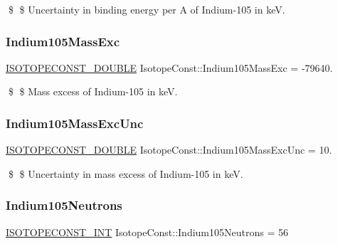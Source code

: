 \$ \$ Uncertainty in binding energy per A of Indium-\/105 in keV. \mbox{\label{group___isotope_const-_indium-_in105_ga42d9afde4d2eefc3d8d59a1fde401a6c}} 
\subsubsection{\texorpdfstring{Indium105\+Mass\+Exc}{Indium105MassExc}}
{\footnotesize\ttfamily \mbox{\hyperlink{group___isotope_const-_macros_ga8f45a7272ce02c0b4c65c44636ed719a}{I\+S\+O\+T\+O\+P\+E\+C\+O\+N\+S\+T\+\_\+\+D\+O\+U\+B\+LE}} Isotope\+Const\+::\+Indium105\+Mass\+Exc = -\/79640.}

\$ \$ Mass excess of Indium-\/105 in keV. \mbox{\label{group___isotope_const-_indium-_in105_gaa17bebb6dd62589ed8da033df4a0eefc}} 
\subsubsection{\texorpdfstring{Indium105\+Mass\+Exc\+Unc}{Indium105MassExcUnc}}
{\footnotesize\ttfamily \mbox{\hyperlink{group___isotope_const-_macros_ga8f45a7272ce02c0b4c65c44636ed719a}{I\+S\+O\+T\+O\+P\+E\+C\+O\+N\+S\+T\+\_\+\+D\+O\+U\+B\+LE}} Isotope\+Const\+::\+Indium105\+Mass\+Exc\+Unc = 10.}

\$ \$ Uncertainty in mass excess of Indium-\/105 in keV. \mbox{\label{group___isotope_const-_indium-_in105_ga1b3366b58e36a4f79c27c74f9a4f5fae}} 
\subsubsection{\texorpdfstring{Indium105\+Neutrons}{Indium105Neutrons}}
{\footnotesize\ttfamily \mbox{\hyperlink{group___isotope_const-_macros_ga5f18360b3e99483a35c32d789e62621c}{I\+S\+O\+T\+O\+P\+E\+C\+O\+N\+S\+T\+\_\+\+I\+NT}} Isotope\+Const\+::\+Indium105\+Neutrons = 56}

